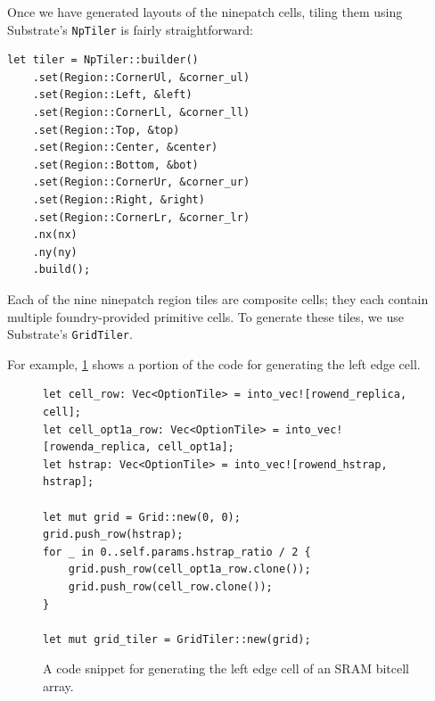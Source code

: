 
Once we have generated layouts of the ninepatch cells, tiling them 
using Substrate's \verb|NpTiler| is fairly straightforward:

\begin{verbatim}
let tiler = NpTiler::builder()
    .set(Region::CornerUl, &corner_ul)
    .set(Region::Left, &left)
    .set(Region::CornerLl, &corner_ll)
    .set(Region::Top, &top)
    .set(Region::Center, &center)
    .set(Region::Bottom, &bot)
    .set(Region::CornerUr, &corner_ur)
    .set(Region::Right, &right)
    .set(Region::CornerLr, &corner_lr)
    .nx(nx)
    .ny(ny)
    .build();
\end{verbatim}

Each of the nine ninepatch region tiles are composite cells; they each contain
multiple foundry-provided primitive cells. To generate these tiles, we use Substrate's \verb|GridTiler|.

For example, \ref{fig:bitcell-left-cell-code} shows a portion of the code for generating the left edge cell.
\begin{figure}[H] \centering
\begin{verbatim} 
let cell_row: Vec<OptionTile> = into_vec![rowend_replica, cell];
let cell_opt1a_row: Vec<OptionTile> = into_vec![rowenda_replica, cell_opt1a];
let hstrap: Vec<OptionTile> = into_vec![rowend_hstrap, hstrap];

let mut grid = Grid::new(0, 0);
grid.push_row(hstrap);
for _ in 0..self.params.hstrap_ratio / 2 {
    grid.push_row(cell_opt1a_row.clone());
    grid.push_row(cell_row.clone());
}

let mut grid_tiler = GridTiler::new(grid);
\end{verbatim}
\caption{A code snippet for generating the left edge cell of an SRAM bitcell array. \label{fig:bitcell-left-cell-code}}
\end{figure}


